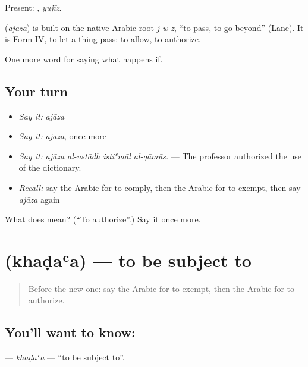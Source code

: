 Present: , \emph{yujīz}.

\begin{cousinweb}
\textbf{} (\emph{ajāza}) is built on the native Arabic root \emph{j-w-z}, \textquotedblleft{}to pass, to go beyond\textquotedblright{} (Lane). It is Form IV, to let a thing pass: to allow, to authorize.
\end{cousinweb}

\begin{grammarlens}[title={What you've built}]
One more word for saying what happens if.
\end{grammarlens}

\subsection*{Your turn}
\begin{itemize}
\raggedright
  \item \emph{Say it:} \emph{ajāza}
  \item \emph{Say it:} \emph{ajāza}, once more
  \item \emph{Say it:} \emph{ajāza al-ustādh istiʿmāl al-qāmūs.} — The professor authorized the use of the dictionary.
  \item \emph{Recall:} say the Arabic for to comply, then the Arabic for to exempt, then say \emph{ajāza} again
\end{itemize}

\begin{tcolorbox}[breakable,colback=teal!4,colframe=teal!35!black,title={Before you move on}]
What does  mean? (\textquotedblleft{}To authorize\textquotedblright{}.) Say it once more.
\end{tcolorbox}
\section[\texorpdfstring{\ar{خضع} (khaḍaʿa)}{خضع (khaḍaʿa)}]{ (khaḍaʿa) — to be subject to}

\label{lesson:AR-C411-khadaa}



\begin{quote}
Before the new one: say the Arabic for to exempt, then the Arabic for to authorize.
\end{quote}

\subsection*{You'll want to know: }
\textbf{} — \emph{khaḍaʿa} — \textquotedblleft{}to be subject to\textquotedblright{}.

